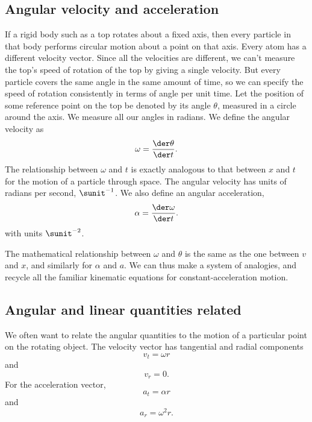 \subsection{Angular velocity and acceleration}
If a rigid body such as a top rotates about a fixed axis, then every particle in that body
performs circular motion about a point on that axis.
Every atom has a different velocity
vector. Since all the velocities are different, we
can't measure the top's speed of rotation of the top by giving a
single velocity.
But every particle covers the same angle in the same
amount of time, so we can specify the speed of
rotation consistently in terms of angle per unit time. Let
the position of some reference point on the top be denoted
by its angle $\theta$, measured in a circle around the axis. We measure
all our angles in radians.  We define the angular velocity as
\begin{equation*}
        \omega        =          \frac{\der\theta}{\der t} .
\end{equation*}
The relationship between $\omega$ and $t$ is
exactly analogous to that between $x$ and $t$ for the motion of
a particle through space.
The angular velocity has units of radians per second, $\sunit^{-1}$.
We also define an
angular acceleration,
\begin{equation*}
        \alpha        =          \frac{\der\omega}{\der t}.
\end{equation*}
with units $\sunit^{-2}$.

The mathematical relationship between $\omega$ and $\theta$ is the same as
the one between $v$ and $x$, and similarly for $\alpha$ and $a$. We can
thus make a system of analogies, and recycle all
the familiar kinematic equations for constant-acceleration
motion.

\subsection{Angular and linear quantities related}
We often want to relate the angular
quantities to the motion of a particular point on the rotating
object.
The velocity vector has tangential and radial components
\begin{equation*}
        v_t        =  \omega r
\end{equation*}
and
\begin{equation*}
        v_r        =  0.
\end{equation*}
For the acceleration vector,
\begin{equation*}
        a_t        =  \alpha r
\end{equation*}
and
\begin{equation*}
        a_r        =  \omega^2 r.
\end{equation*}
